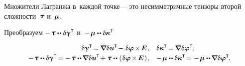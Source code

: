 \begin{otherlanguage}{russian}

\vspace{-0.2em} \noindent Множители Лагранжа в~каждой точке\:--- это несимметричные тензоры второй сложности~$\forcestresstensor$ и~$\bm{\mu}$.

Преобразуем ${- \hspace{.2ex} \forcestresstensor \dotdotp \variation{\distortiontensor}^{\T}}$ и~${- \hspace{.2ex} \couplestresstensor \dotdotp \variation{\wrynesstensor}^{\T}}$

\nopagebreak\begin{equation*}
\begin{array}{rl}
\variation{\distortiontensor}^{\T} \hspace{-0.32ex}
= \hspace{-0.16ex} \boldnabla \variation{\fieldofdisplacements}^{\hspace{-0.05ex}\T} \hspace{-0.3ex}
- \hspace{.1ex} \variation{\fieldofrotations} \hspace{-0.2ex} \times \hspace{-0.2ex} \UnitDyad \hspace{.1ex}
, &
\variation{\wrynesstensor}^{\T} \hspace{-0.32ex} = \hspace{-0.16ex} \boldnabla \variation{\fieldofrotations}^{\T} \hspace{-0.25ex} ,
\\[.25em]
%
- \hspace{.2ex} \forcestresstensor \dotdotp \variation{\distortiontensor}^{\T} \hspace{-0.32ex}
= - \hspace{.2ex} \forcestresstensor \dotdotp \hspace{-0.16ex} \boldnabla \variation{\fieldofdisplacements}^{\hspace{-0.05ex}\T} \hspace{-0.3ex}
+ \forcestresstensor \dotdotp \hspace{-0.32ex} \left( \hspace{.12ex} \variation{\fieldofrotations} \hspace{-0.2ex} \times \hspace{-0.2ex} \UnitDyad \hspace{.12ex} \right) \hspace{-0.25ex}
, &
- \hspace{.2ex} \couplestresstensor \dotdotp \variation{\wrynesstensor}^{\T} \hspace{-0.32ex}
= - \hspace{.2ex} \couplestresstensor \dotdotp \hspace{-0.16ex} \boldnabla \variation{\fieldofrotations}^{\T} \hspace{-0.25ex} .
\end{array}
\end{equation*}


\end{otherlanguage}
